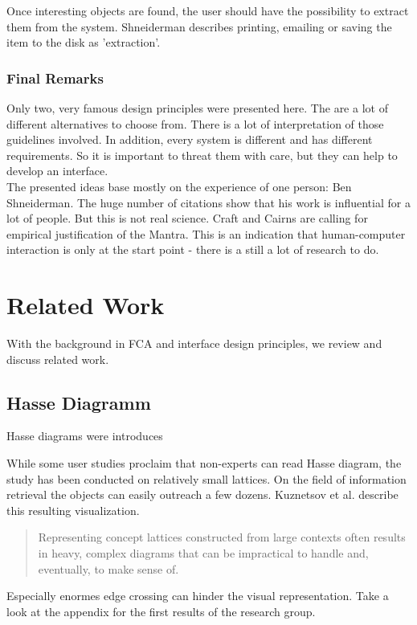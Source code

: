 \documentclass[11pt]{report}
\begin{document}
Once interesting objects are found, the user should have the possibility to extract them from the system. Shneiderman describes printing, emailing or saving the item to the disk as 'extraction'.

\subsection{Final Remarks}

Only two, very famous design principles were presented here. The are a lot of different alternatives to choose from. There is a lot of interpretation of those guidelines involved. In addition, every system is different and has different requirements. So it is important to threat them with care, but they can help to develop an interface. \\

The presented ideas base mostly on the experience of one person: Ben Shneiderman. The huge number of citations show that his work is influential for a lot of people. But this is not real science. Craft and Cairns \cite{Craft2005} are calling for empirical justification of the Mantra. This is an indication that human-computer interaction is only at the start point - there is a still a lot of research to do.

\chapter{Related Work}

With the background in FCA and interface design principles, we review and discuss related work. \\

\section{Hasse Diagramm}

Hasse diagrams were introduces

 While some user studies proclaim that non-experts can read Hasse diagram\cite{Eklund2004}, the study has been conducted on relatively small lattices. On the field of information retrieval the objects can easily outreach a few dozens. Kuznetsov et al. \cite{Kuznetsov20072}  describe this resulting visualization.
\begin{quote}
Representing concept lattices constructed from large contexts often results in heavy, complex diagrams that can be impractical to handle and, eventually, to make sense of.	
\end{quote}
Especially enormes edge crossing can hinder the visual representation. Take a look at the appendix for the first results of the research group. 
\end{document}
